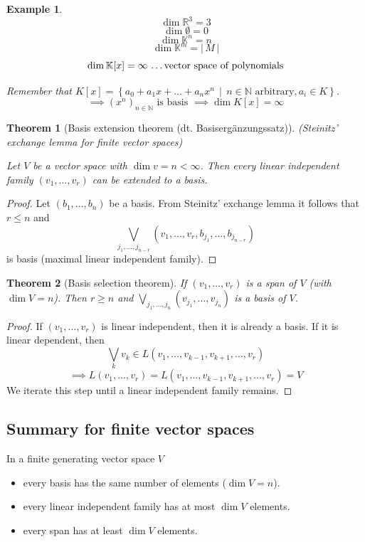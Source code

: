 \documentclass[a4paper,landscape,twocolumn]{article}
\newcommand\setdef[2]{\left\{#1\,\middle|\,#2\right\}}
\newcommand\card[1]{\left|\,#1\,\right|}
\newtheorem{theorem}{Theorem}[section]
\newtheorem{ex}{Example}[section]
\begin{document}
\begin{ex}
  \[ \dim{\mathbb R^3} = 3 \]
  \[ \dim{\emptyset} = 0 \]
  \[ \dim{\mathbb K^n} = n \]
  \[ \dim{\mathbb K^m} = \card{M} \]
  \[ \dim{\mathbb K[x]} = \infty \text{ \dots vector space of polynomials} \]

  Remember that $K[x] = \setdef{a_0 + a_1 x + \dots + a_n x^n}{n \in \mathbb N \text{ arbitrary}, a_i \in K}$.
  \[ \implies (x^n)_{n \in \mathbb N} \text{ is basis } \implies \dim{K[x]} = \infty \]
\end{ex}

\begin{theorem}[Basis extension theorem (dt. \foreignlanguage{ngerman}{Basisergänzungssatz})]
  \label{basis-extension}
  (Steinitz' exchange lemma for finite vector spaces)

  Let $V$ be a vector space with $\dim{v} = n < \infty$.
  Then every linear independent family $(v_1, \dots, v_r)$ can be extended to a basis.
\end{theorem}

\begin{proof}
  Let $(b_1, \dots, b_n)$ be a basis.
  From Steinitz' exchange lemma it follows that $r \leq n$ and
  \[ \bigvee_{j_1, \dots, j_{n-r}} (v_1, \dots, v_r, b_{j_1}, \dots, b_{j_{n-r}}) \]
  is basis (maximal linear independent family).
\end{proof}

\begin{theorem}[Basis selection theorem]
  If $(v_1, \dots, v_r)$ is a span of $V$ (with $\dim{V} = n$).
  Then $r \geq n$ and $\bigvee_{j_1, \dots, j_n} (v_{j_1}, \dots, v_{j_n})$ is a basis of $V$.
\end{theorem}

\begin{proof}
  If $(v_1, \dots, v_r)$ is linear independent, then it is already a basis.
  If it is linear dependent, then
  \[ \bigvee_{k} v_k \in L(v_1, \dots, v_{k-1}, v_{k+1}, \dots, v_r) \]
  \[ \implies L(v_1, \dots, v_r) = L(v_1, \dots, v_{k-1}, v_{k+1}, \dots, v_r) = V \]
  We iterate this step until a linear independent family remains.
\end{proof}

\subsection{Summary for finite vector spaces}
In a finite generating vector space $V$
\begin{itemize}
  \item every basis has the same number of elements ($\dim{V} = n$).
  \item every linear independent family has at most $\dim{V}$ elements.
  \item every span has at least $\dim{V}$ elements.
\end{itemize}
\end{document}
